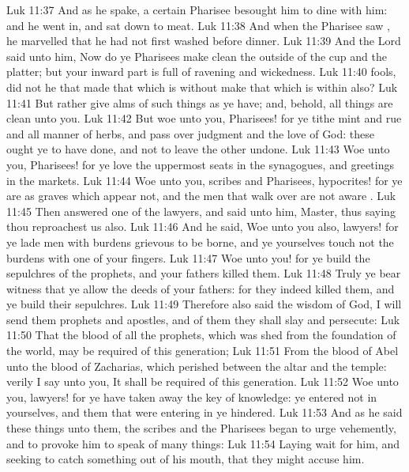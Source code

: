 \vs Luk 11:37 And as he spake, a certain Pharisee besought him to dine with him: and he went in, and sat down to meat.
\vs Luk 11:38 And when the Pharisee saw , he marvelled that he had not first washed before dinner.
\vs Luk 11:39 And the Lord said unto him, Now do ye Pharisees make clean the outside of the cup and the platter; but your inward part is full of ravening and wickedness.
\vs Luk 11:40  fools, did not he that made that which is without make that which is within also?
\vs Luk 11:41 But rather give alms of such things as ye have; and, behold, all things are clean unto you.
\vs Luk 11:42 But woe unto you, Pharisees! for ye tithe mint and rue and all manner of herbs, and pass over judgment and the love of God: these ought ye to have done, and not to leave the other undone.
\vs Luk 11:43 Woe unto you, Pharisees! for ye love the uppermost seats in the synagogues, and greetings in the markets.
\vs Luk 11:44 Woe unto you, scribes and Pharisees, hypocrites! for ye are as graves which appear not, and the men that walk over  are not aware .
\vs Luk 11:45 Then answered one of the lawyers, and said unto him, Master, thus saying thou reproachest us also.
\vs Luk 11:46 And he said, Woe unto you also,  lawyers! for ye lade men with burdens grievous to be borne, and ye yourselves touch not the burdens with one of your fingers.
\vs Luk 11:47 Woe unto you! for ye build the sepulchres of the prophets, and your fathers killed them.
\vs Luk 11:48 Truly ye bear witness that ye allow the deeds of your fathers: for they indeed killed them, and ye build their sepulchres.
\vs Luk 11:49 Therefore also said the wisdom of God, I will send them prophets and apostles, and  of them they shall slay and persecute:
\vs Luk 11:50 That the blood of all the prophets, which was shed from the foundation of the world, may be required of this generation;
\vs Luk 11:51 From the blood of Abel unto the blood of Zacharias, which perished between the altar and the temple: verily I say unto you, It shall be required of this generation.
\vs Luk 11:52 Woe unto you, lawyers! for ye have taken away the key of knowledge: ye entered not in yourselves, and them that were entering in ye hindered.
\vs Luk 11:53 And as he said these things unto them, the scribes and the Pharisees began to urge  vehemently, and to provoke him to speak of many things:
\vs Luk 11:54 Laying wait for him, and seeking to catch something out of his mouth, that they might accuse him.
